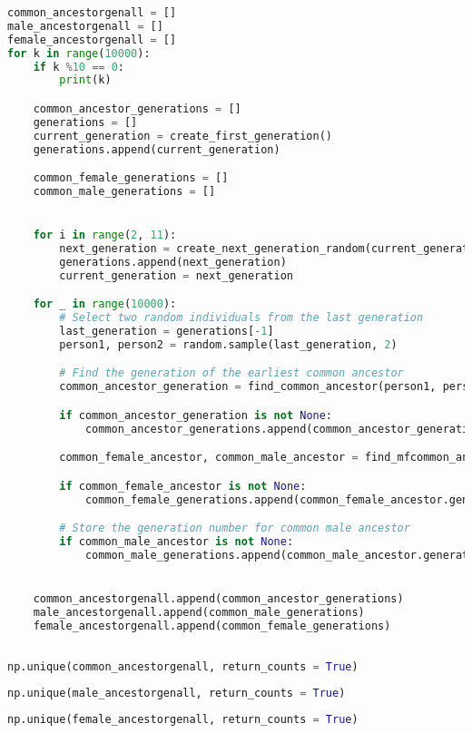 \begin{lstlisting}[language=Python]
common_ancestorgenall = []
male_ancestorgenall = []
female_ancestorgenall = []
for k in range(10000):
    if k %10 == 0:
        print(k)

    common_ancestor_generations = []
    generations = []
    current_generation = create_first_generation()
    generations.append(current_generation)

    common_female_generations = []
    common_male_generations = []


    for i in range(2, 11):
        next_generation = create_next_generation_random(current_generation, i)
        generations.append(next_generation)
        current_generation = next_generation

    for _ in range(10000):
        # Select two random individuals from the last generation
        last_generation = generations[-1]
        person1, person2 = random.sample(last_generation, 2)

        # Find the generation of the earliest common ancestor
        common_ancestor_generation = find_common_ancestor(person1, person2)

        if common_ancestor_generation is not None:
            common_ancestor_generations.append(common_ancestor_generation)

        common_female_ancestor, common_male_ancestor = find_mfcommon_ancestor(person1, person2)

        if common_female_ancestor is not None:
            common_female_generations.append(common_female_ancestor.generation)

        # Store the generation number for common male ancestor
        if common_male_ancestor is not None:
            common_male_generations.append(common_male_ancestor.generation)


    common_ancestorgenall.append(common_ancestor_generations)
    male_ancestorgenall.append(common_male_generations)
    female_ancestorgenall.append(common_female_generations)



\end{lstlisting}
\begin{lstlisting}[language=Python]
np.unique(common_ancestorgenall, return_counts = True)
\end{lstlisting}
\begin{lstlisting}[language=Python]
np.unique(male_ancestorgenall, return_counts = True)
\end{lstlisting}
\begin{lstlisting}[language=Python]
np.unique(female_ancestorgenall, return_counts = True)
\end{lstlisting}


